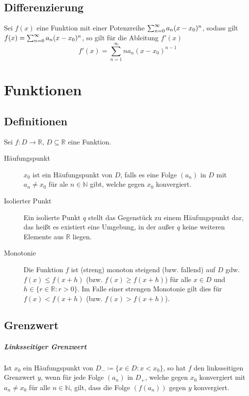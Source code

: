     \section{Differenzierung}
        Sei $ f(x) $ eine Funktion mit einer Potenzreihe $ \sum_{n = 0}^\infty a _ n (x - x _ 0) ^ n $, sodass gilt $ f(x) = \sum_{n = 0}^\infty a _ n (x - x _ 0) ^ n $, so gilt für die Ableitung $ f'(x) $ \[ f'(x) = \sum _ { n = 1 } ^ \infty n a _ n (x - x _ 0) ^ { n - 1 } \]

\chapter{Funktionen}
    \section{Definitionen}
        Sei $ f : D \rightarrow \mathbb{R} $, $ D \subseteq \mathbb{R} $ eine Funktion.

        \begin{description}
            \item[Häufungspunkt] $ x _ 0 $ ist ein Häufungspunkt von $ D $, falls es eine Folge $ (a _ n) $ in $ D $ mit $ a _ n \neq x _ 0 $ für ale $ n \in \mathbb{N} $ gibt, welche gegen $ x _ 0 $ konvergiert.
            \item[Isolierter Punkt] Ein isolierte Punkt $ q $ stellt das Gegenstück zu einem Häufungspunkt dar, das heißt es existiert eine Umgebung, in der außer $ q $ keine weiteren Elemente aus $ \mathbb{R} $ liegen.
            \item[Monotonie] Die Funktion $ f $ ist (streng) monoton steigend (bzw. fallend) auf $ D $ gdw. $ f(x) \leq f(x + h) $ (bzw. $ f(x) \geq f(x + h) $) für alle $ x \in D $ und $ h \in \{ r \in \mathbb{R} : r > 0 \} $. Im Falle einer strengen Monotonie gilt dies für $ f(x) < f(x + h) $ (bzw. $ f(x) > f(x + h) $).
        \end{description}

    \section{Grenzwert}
        \paragraph{Linksseitiger Grenzwert}
            Ist $ x _ 0 $ ein Häufungspunkt von $ D _ - \coloneqq \{ x \in D : x < x _ 0 \} $, so hat $ f $ den linksseitigen Grenzwert $ y $, wenn für jede Folge $ (a _ n) $ in $ D _ + $, welche gegen $ x _ 0 $ konvergiert mit $ a _ n \neq x _ 0 $ für alle $ n \in \mathbb{N} $, gilt, dass die Folge $ (f(a _ n)) $ gegen $ y $ konvergiert.

